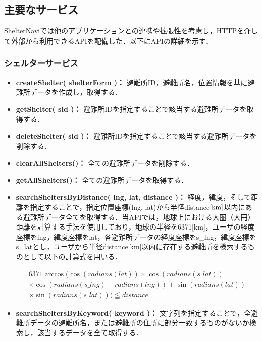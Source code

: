 \documentclass[technicalreport,dvipdfmx]{ieicej}
\begin{document}
\subsection{主要なサービス}
\label{sec:service}
ShelterNaviでは他のアプリケーションとの連携や拡張性を考慮し，HTTPを介して外部から利用できるAPIを配備した．以下にAPIの詳細を示す．

\subsubsection{シェルターサービス}
\begin{itemize}
    \item{\textbf{createShelter( shelterForm )：}
         避難所ID，避難所名，位置情報を基に避難所データを作成し，取得する．}
    \item{\textbf{getShelter( sid )：}
         避難所IDを指定することで該当する避難所データを取得する．}
    \item{\textbf{deleteShelter( sid )：}
         避難所IDを指定することで該当する避難所データを削除する．}
    \item{\textbf{clearAllShelters()：}
         全ての避難所データを削除する．}
    \item{\textbf{getAllShelters()：}
         全ての避難所データを取得する．}
    \item{\textbf{searchSheltersByDistance( lng, lat, distance )：}
         経度，緯度，そして距離を指定することで，指定位置座標(lng, lat)から半径distance$\rm[km]$以内にある避難所データ全てを取得する．当APIでは，地球上における大圏（大円）距離を計算する手法を使用しており，地球の半径を6371[km]，ユーザの経度座標をlng，緯度座標をlat，各避難所データの経度座標をs\_lng，緯度座標をs\_latとし，ユーザから半径distance[km]以内に存在する避難所を検索するものとして以下の計算式を用いる．

         \begin{eqnarray*}
             6371 \arccos ( \cos( radians( lat ) ) \times \cos( radians( s\_lat ) ) \\
             \times \cos( radians( s\_lng ) - radians( lng ) ) + \sin( radians( lat ) ) \\
             \times \sin( radians( s\_lat ) ) ) \leqq distance
         \end{eqnarray*}}
    \item{\textbf{searchSheltersByKeyword( keyword )：}
         文字列を指定することで，全避難所データの避難所名，または避難所の住所に部分一致するものがないか検索し，該当するデータを全て取得する．}
\end{itemize}
\end{document}
